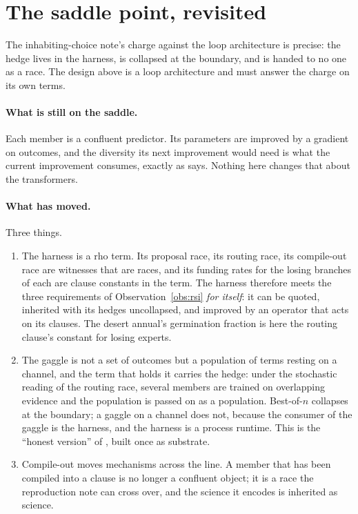 \documentclass[11pt]{article}
\theoremstyle{plain}
\theoremstyle{definition}
\theoremstyle{remark}
\begin{document}
\section{The saddle point, revisited}\label{sec:saddle}

The inhabiting-choice note's charge against the loop architecture is precise:
the hedge lives in the harness, is collapsed at the boundary, and is handed to
no one as a race. The design above is a loop architecture and must answer the
charge on its own terms.

\paragraph{What is still on the saddle.} Each member is a confluent predictor.
Its parameters are improved by a gradient on outcomes, and the diversity its
next improvement would need is what the current improvement consumes, exactly
as \cite[\S5.4]{Inhabiting} says. Nothing here changes that about the
transformers.

\paragraph{What has moved.} Three things.

\begin{enumerate}[leftmargin=1.6em,itemsep=2pt]
\item The harness is a rho term. Its proposal race, its routing race, its
compile-out race are witnesses that are races, and its funding rates for the
losing branches of each are clause constants in the term. The harness
therefore meets the three requirements of Observation~\ref{obs:rsi} \emph{for
itself}: it can be quoted, inherited with its hedges uncollapsed, and improved
by an operator that acts on its clauses. The desert annual's germination
fraction is here the routing clause's constant for losing experts.
\item The gaggle is not a set of outcomes but a population of terms resting on
a channel, and the term that holds it carries the hedge: under the stochastic
reading of the routing race, several members are trained on overlapping
evidence and the population is passed on as a population. Best-of-$n$ collapses
at the boundary; a gaggle on a channel does not, because the consumer of the
gaggle is the harness, and the harness is a process runtime. This is the
``honest version'' of \cite[\S5.5]{Inhabiting}, built once as substrate.
\item Compile-out moves mechanisms across the line. A member that has been
compiled into a clause is no longer a confluent object; it is a race the
reproduction note can cross over, and the science it encodes is inherited as
science.
\end{enumerate}
\end{document}
